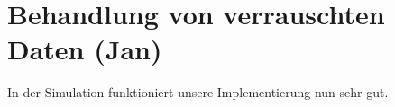 \section{Behandlung von verrauschten Daten (Jan)}

In der Simulation funktioniert unsere Implementierung nun sehr gut.